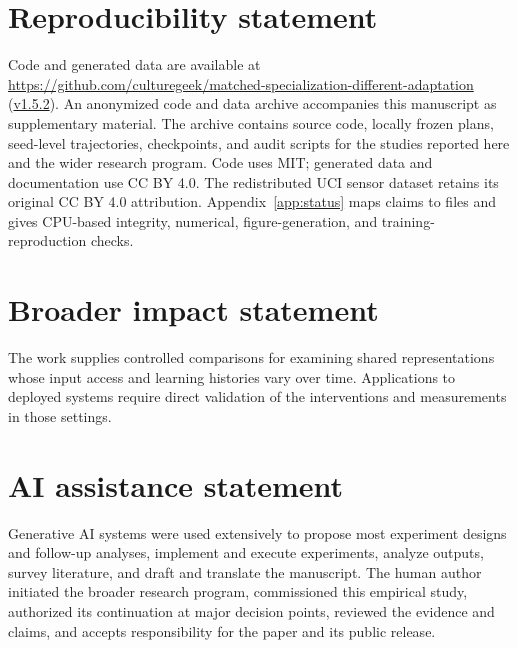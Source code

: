 \section*{Reproducibility statement}
\ifpublicrelease
Code and generated data are available at \url{https://github.com/culturegeek/matched-specialization-different-adaptation} (\href{https://github.com/culturegeek/matched-specialization-different-adaptation/releases/tag/v1.5.2}{v1.5.2}).
\else
An anonymized code and data archive accompanies this manuscript as supplementary material.
\fi
The archive contains source code, locally frozen plans, seed-level trajectories, checkpoints, and audit scripts for the studies reported here and the wider research program. Code uses MIT; generated data and documentation use CC BY 4.0. The redistributed UCI sensor dataset retains its original CC BY 4.0 attribution. Appendix~\ref{app:status} maps claims to files and gives CPU-based integrity, numerical, figure-generation, and training-reproduction checks.

\section*{Broader impact statement}
The work supplies controlled comparisons for examining shared representations whose input access and learning histories vary over time. Applications to deployed systems require direct validation of the interventions and measurements in those settings.

\section*{AI assistance statement}
Generative AI systems were used extensively to propose most experiment designs and follow-up analyses, implement and execute experiments, analyze outputs, survey literature, and draft and translate the manuscript. The human author initiated the broader research program, commissioned this empirical study, authorized its continuation at major decision points, reviewed the evidence and claims, and accepts responsibility for the paper and its public release.



\FloatBarrier
\appendix

